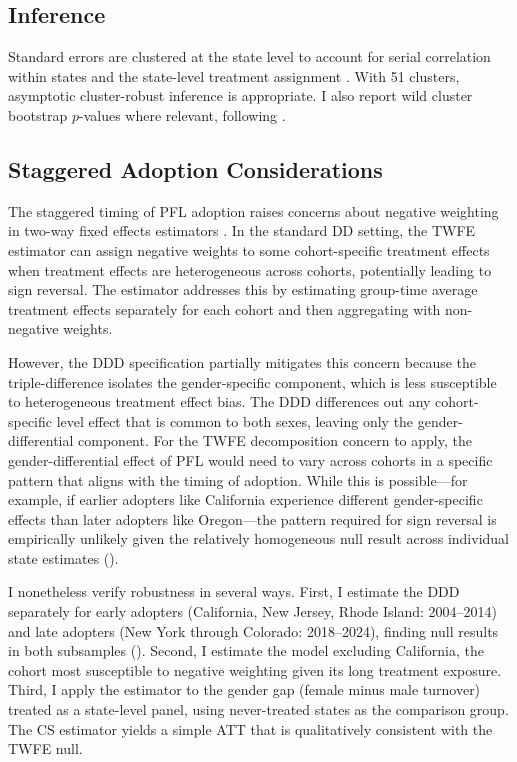 \documentclass[12pt]{article}
\begin{document}
\subsection{Inference}

Standard errors are clustered at the state level to account for serial correlation within states and the state-level treatment assignment \citep{bertrand2004}. With 51 clusters, asymptotic cluster-robust inference is appropriate. I also report wild cluster bootstrap $p$-values where relevant, following \citet{cameron2008}.

\subsection{Staggered Adoption Considerations}

The staggered timing of PFL adoption raises concerns about negative weighting in two-way fixed effects estimators \citep{goodmanbacon2021}. In the standard DD setting, the TWFE estimator can assign negative weights to some cohort-specific treatment effects when treatment effects are heterogeneous across cohorts, potentially leading to sign reversal. The \citet{callaway2021} estimator addresses this by estimating group-time average treatment effects separately for each cohort and then aggregating with non-negative weights.

However, the DDD specification partially mitigates this concern because the triple-difference isolates the gender-specific component, which is less susceptible to heterogeneous treatment effect bias. The DDD differences out any cohort-specific level effect that is common to both sexes, leaving only the gender-differential component. For the TWFE decomposition concern to apply, the gender-differential effect of PFL would need to vary across cohorts in a specific pattern that aligns with the timing of adoption. While this is possible---for example, if earlier adopters like California experience different gender-specific effects than later adopters like Oregon---the pattern required for sign reversal is empirically unlikely given the relatively homogeneous null result across individual state estimates ().

I nonetheless verify robustness in several ways. First, I estimate the DDD separately for early adopters (California, New Jersey, Rhode Island: 2004--2014) and late adopters (New York through Colorado: 2018--2024), finding null results in both subsamples (). Second, I estimate the model excluding California, the cohort most susceptible to negative weighting given its long treatment exposure. Third, I apply the \citet{callaway2021} estimator to the gender gap (female minus male turnover) treated as a state-level panel, using never-treated states as the comparison group. The CS estimator yields a simple ATT that is qualitatively consistent with the TWFE null.
\end{document}

